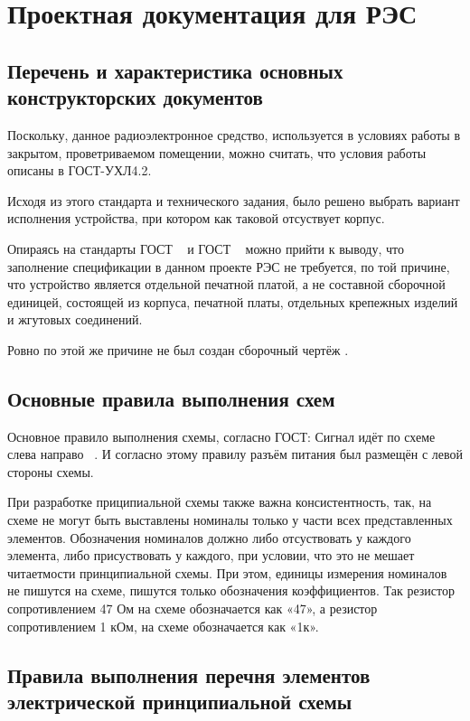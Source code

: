 \section{Проектная документация для РЭС}

\subsection{Перечень и характеристика основных конструкторских документов}

Поскольку, данное радиоэлектронное средство,
используется в условиях работы в закрытом, проветриваемом помещении,
можно считать, что условия работы описаны в ГОСТ-УХЛ4.2.

Исходя из этого стандарта и технического задания,
было решено выбрать вариант исполнения устройства,
при котором как таковой отсуствует корпус.

Опираясь на стандарты ГОСТ ~\cite{GOST-spec}
и ГОСТ ~\cite{GOST-SEL} можно прийти к выводу,
что заполнение спецификации в данном проекте РЭС не требуется,
по той причине, что устройство является отдельной печатной платой,
а не составной сборочной единицей,
состоящей из корпуса, печатной платы,
отдельных крепежных изделий и жгутовых соединений.

Ровно по этой же причине не был создан сборочный чертёж .

\subsection{Основные правила выполнения схем}

Основное правило выполнения схемы, согласно ГОСТ:
Сигнал идёт по схеме слева направо ~\cite{GOST-schematic-main}.
И согласно этому правилу разъём питания был размещён с левой стороны схемы.

При разработке приципиальной схемы также важна консистентность,
так, на схеме не могут быть выставлены номиналы только у части
всех представленных элементов.
Обозначения номиналов должно либо отсуствовать у каждого элемента,
либо присуствовать у каждого, при условии,
что это не мешает читаетмости принципиальной схемы.
При этом,
единицы измерения номиналов не пишутся на схеме,
пишутся только обозначения коэффициентов.
Так резистор сопротивлением 47 Ом на схеме обозначается как «47», а
резистор сопротивлением 1 кОм, на схеме обозначается как «1к».

\subsection{Правила выполнения
  перечня элементов электрической принципиальной схемы}

